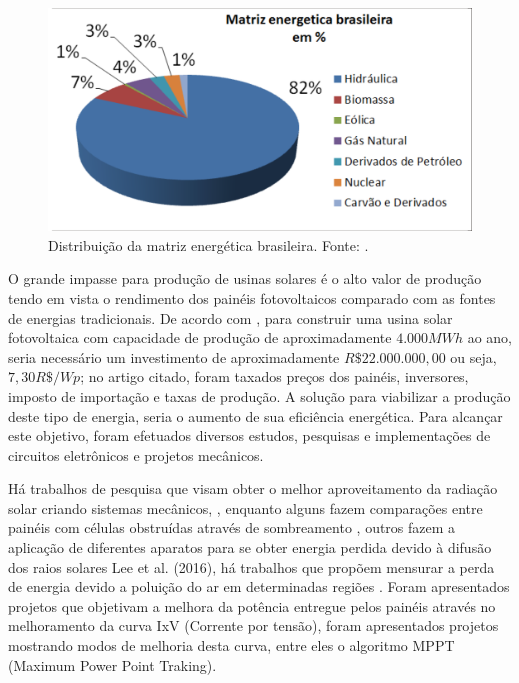 \FloatBarrier
\begin{figure}[htbp]
	\centering
	\includegraphics[scale=0.5]{imagens/FontesEnergia}
	\caption{Distribuição da matriz energética brasileira. Fonte:  . }
	
	\label{fig:FonteEnergia}
\end{figure}
\FloatBarrier

O grande impasse para produção de usinas solares é o alto valor de produção tendo em vista o rendimento dos painéis fotovoltaicos comparado  com as fontes de energias tradicionais. De acordo com , para construir uma usina solar fotovoltaica com capacidade de produção de aproximadamente $4.000MWh$ ao ano, seria necessário um investimento de aproximadamente $R\$ 22.000.000,00$ ou seja, $7,30 R\$/Wp$; no artigo citado, foram taxados preços dos painéis, inversores, imposto de importação e taxas de produção. A solução para viabilizar a produção deste tipo de energia, seria o aumento de sua eficiência energética. Para alcançar este objetivo, foram efetuados diversos estudos, pesquisas e implementações de circuitos eletrônicos e projetos mecânicos.
 
Há trabalhos de pesquisa que visam obter o melhor aproveitamento da radiação solar criando sistemas mecânicos, ,  enquanto alguns fazem comparações entre painéis com células obstruídas através de sombreamento , outros fazem a aplicação de diferentes aparatos para se obter energia perdida devido à difusão dos raios solares Lee et al. (2016), há trabalhos que propõem mensurar a perda de energia devido a poluição do ar em determinadas regiões . Foram apresentados projetos que objetivam a melhora da potência entregue pelos painéis através no melhoramento da curva IxV (Corrente por tensão), foram apresentados projetos mostrando modos de melhoria desta curva, entre eles o algoritmo MPPT (Maximum Power Point Traking).  

